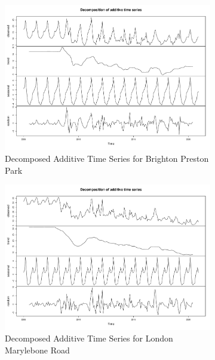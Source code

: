 \begin{figure}
    \begin{subfigure}{.5\textwidth}
        \centering
        \includegraphics[width=\linewidth]{Images/Brighton Preston Park ts.pdf}
        \caption{Decomposed Additive Time Series for Brighton Preston Park}
        \label{fig:BPPts}
    \end{subfigure}%
    \begin{subfigure}{.5\textwidth}
        \centering
        \includegraphics[width=\linewidth]{Images/London Marylebone Road ts.pdf}
        \caption{Decomposed Additive Time Series for London Marylebone Road}
        \label{fig:LMRts}
    \end{subfigure}
    \begin{subfigure}{.5\textwidth}
        \centering

\end{subfigure}
\end{figure}
